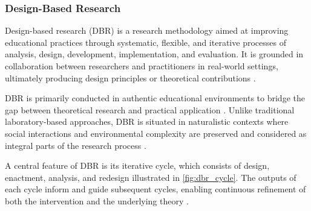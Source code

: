 \subsubsection{Design-Based Research}

Design-based research (DBR) is a research methodology aimed at improving educational practices through systematic, flexible, and iterative processes of analysis, design, development, implementation, and evaluation. It is grounded in collaboration between researchers and practitioners in real-world settings, ultimately producing design principles or theoretical contributions \parencite{wang_influence_2026}.

DBR is primarily conducted in authentic educational environments to bridge the gap between theoretical research and practical application \parencite{jong_design-based_2017}. Unlike traditional laboratory-based approaches, DBR is situated in naturalistic contexts where social interactions and environmental complexity are preserved and considered as integral parts of the research process \parencite{wang_influence_2026}.

A central feature of DBR is its iterative cycle, which consists of design, enactment, analysis, and redesign illustrated in \cref{fig:dbr_cycle}. The outputs of each cycle inform and guide subsequent cycles, enabling continuous refinement of both the intervention and the underlying theory \parencite{jong_design-based_2017}.

